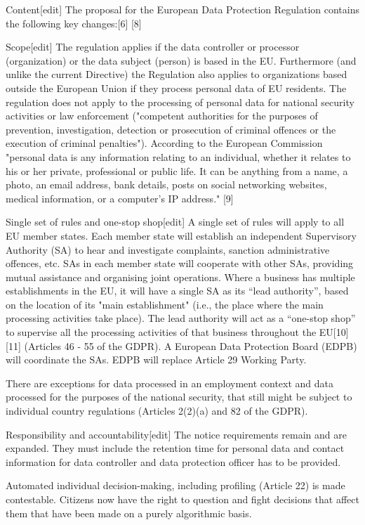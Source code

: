 Content[edit]
The proposal for the European Data Protection Regulation contains the following key changes:[6] [8]

Scope[edit]
The regulation applies if the data controller or processor (organization) or the data subject (person) is based in the EU. Furthermore (and unlike the current Directive) the Regulation also applies to organizations based outside the European Union if they process personal data of EU residents. The regulation does not apply to the processing of personal data for national security activities or law enforcement ("competent authorities for the purposes of prevention, investigation, detection or prosecution of criminal offences or the execution of criminal penalties"). According to the European Commission "personal data is any information relating to an individual, whether it relates to his or her private, professional or public life. It can be anything from a name, a photo, an email address, bank details, posts on social networking websites, medical information, or a computer’s IP address." [9]

Single set of rules and one-stop shop[edit]
A single set of rules will apply to all EU member states. Each member state will establish an independent Supervisory Authority (SA) to hear and investigate complaints, sanction administrative offences, etc. SAs in each member state will cooperate with other SAs, providing mutual assistance and organising joint operations. Where a business has multiple establishments in the EU, it will have a single SA as its “lead authority”, based on the location of its "main establishment" (i.e., the place where the main processing activities take place). The lead authority will act as a “one-stop shop” to supervise all the processing activities of that business throughout the EU[10][11] (Articles 46 - 55 of the GDPR). A European Data Protection Board (EDPB) will coordinate the SAs. EDPB will replace Article 29 Working Party.

There are exceptions for data processed in an employment context and data processed for the purposes of the national security, that still might be subject to individual country regulations (Articles 2(2)(a) and 82 of the GDPR).

Responsibility and accountability[edit]
The notice requirements remain and are expanded. They must include the retention time for personal data and contact information for data controller and data protection officer has to be provided.

Automated individual decision-making, including profiling (Article 22) is made contestable. Citizens now have the right to question and fight decisions that affect them that have been made on a purely algorithmic basis.

